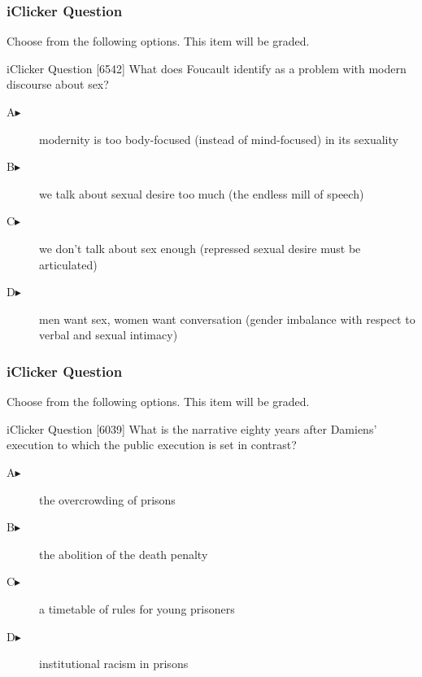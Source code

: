 \documentclass[xcolor=dvipsnames]{beamer}
\begin{document}
\begin{frame}
  \frametitle{iClicker Question}
Choose from the following options. This item will be graded.
\begin{block}{iClicker Question}
[6542] What does Foucault identify as a problem with modern discourse about sex?
\end{block}
\begin{description}
\item[A\hspace{.2in}$\blacktriangleright$] modernity is too
  body-focused (instead of mind-focused) in its sexuality
\item[B\hspace{.2in}$\blacktriangleright$] we talk about sexual desire too much
  (the endless mill of speech)
\item[C\hspace{.2in}$\blacktriangleright$] we don't talk about sex
  enough (repressed sexual desire must be articulated)
\item[D\hspace{.2in}$\blacktriangleright$] men want sex, women want
  conversation (gender imbalance with respect to verbal and sexual
  intimacy)
\end{description}
\end{frame}


\begin{frame}
  \frametitle{iClicker Question}
Choose from the following options. This item will be graded.
\begin{block}{iClicker Question}
[6039] What is the narrative eighty years after Damiens' execution to which
the public execution is set in contrast?
\end{block}
\begin{description}
\item[A\hspace{.2in}$\blacktriangleright$] the overcrowding of prisons
\item[B\hspace{.2in}$\blacktriangleright$] the abolition of the death penalty
\item[C\hspace{.2in}$\blacktriangleright$] a timetable of rules for young prisoners
\item[D\hspace{.2in}$\blacktriangleright$] institutional racism in prisons
\end{description}
\end{frame}
\end{document}

